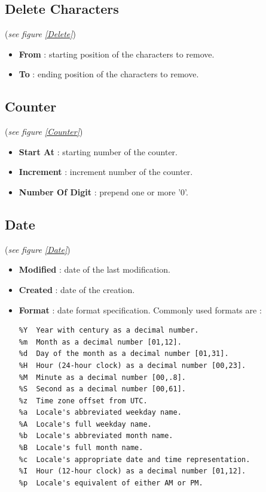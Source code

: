 \documentclass[10pt, a4paper]{scrartcl}
\begin{document}
\subsection*{Delete Characters}
(\emph{see figure \ref{Delete}})\\
\begin{itemize}
        \item \textbf{From} : starting position of the characters to remove.
        \item \textbf{To} : ending position of the characters to remove.
\end{itemize}

\subsection*{Counter}
(\emph{see figure \ref{Counter}})\\
\begin{itemize}
        \item \textbf{Start At} : starting number of the counter. 
        \item \textbf{Increment} : increment number of the counter.
        \item \textbf{Number Of Digit} : prepend one or more '0'.
\end{itemize}

\subsection*{Date}
(\emph{see figure \ref{Date}})\\
\begin{itemize}
        \item \textbf{Modified} : date of the last modification.
        \item \textbf{Created} : date of the creation.
        \item \textbf{Format} : date format specification. Commonly used formats are :
                \begingroup
                \fontsize{8pt}{8pt}\selectfont
\begin{verbatim} 
%Y  Year with century as a decimal number.
%m  Month as a decimal number [01,12].
%d  Day of the month as a decimal number [01,31].
%H  Hour (24-hour clock) as a decimal number [00,23].
%M  Minute as a decimal number [00,.8].
%S  Second as a decimal number [00,61].
%z  Time zone offset from UTC.
%a  Locale's abbreviated weekday name.
%A  Locale's full weekday name.
%b  Locale's abbreviated month name.
%B  Locale's full month name.
%c  Locale's appropriate date and time representation.
%I  Hour (12-hour clock) as a decimal number [01,12].
%p  Locale's equivalent of either AM or PM.
\end{verbatim}
        \endgroup
\end{itemize}
\end{document}
